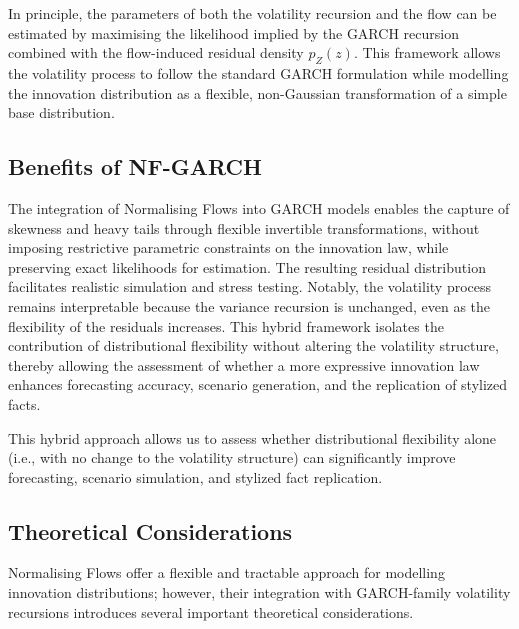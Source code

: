 \documentclass[risks,article,submit,pdftex,moreauthors]{Definitions/mdpi}
\begin{document}
In principle, the parameters of both the volatility recursion and the flow can be estimated by maximising the likelihood implied by the GARCH recursion combined with the flow-induced residual density \( p_Z(z)\). This framework allows the volatility process to follow the standard GARCH formulation while modelling the innovation distribution as a flexible, non-Gaussian transformation of a simple base distribution.

\subsection{Benefits of NF-GARCH} 

The integration of Normalising Flows into GARCH models enables the capture of skewness and heavy tails through flexible invertible transformations, without imposing restrictive parametric constraints on the innovation law, while preserving exact likelihoods for estimation. The resulting residual distribution facilitates realistic simulation and stress testing. Notably, the volatility process remains interpretable because the variance recursion is unchanged, even as the flexibility of the residuals increases. This hybrid framework isolates the contribution of distributional flexibility without altering the volatility structure, thereby allowing the assessment of whether a more expressive innovation law enhances forecasting accuracy, scenario generation, and the replication of stylized facts.

This hybrid approach allows us to assess whether distributional flexibility alone (i.e., with no change to the volatility structure) can significantly improve forecasting, scenario simulation, and stylized fact replication.


\subsection{Theoretical Considerations}
Normalising Flows offer a flexible and tractable approach for modelling innovation distributions; however, their integration with GARCH-family volatility recursions introduces several important theoretical considerations.
\end{document}
